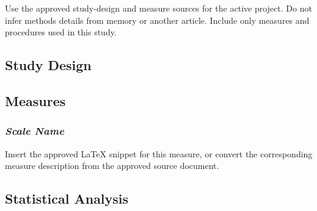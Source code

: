 Use the approved study-design and measure sources for the active project. Do not infer methods details from memory or another article. Include only measures and procedures used in this study.

\subsection{Study Design}

\subsection{Measures}

\subsubsection{\textit{Scale Name}}

Insert the approved LaTeX snippet for this measure, or convert the corresponding measure description from the approved source document.

\subsection{Statistical Analysis}
